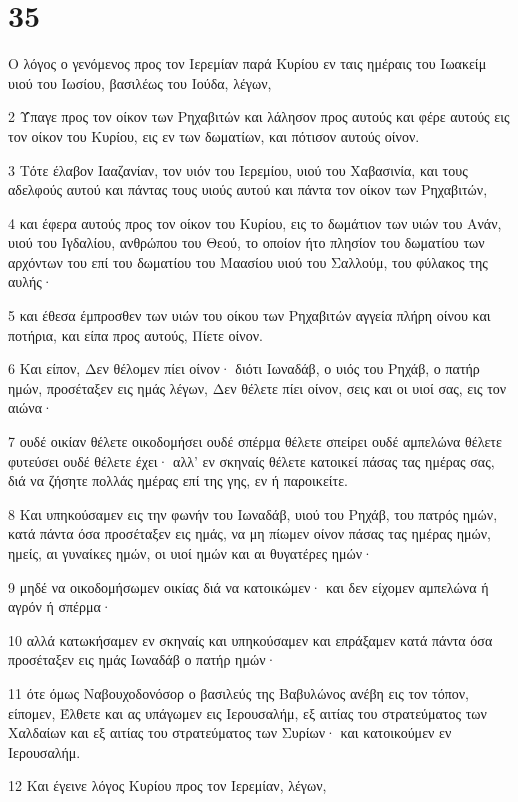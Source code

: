 \chapter{35}

\par Ο λόγος ο γενόμενος προς τον Ιερεμίαν παρά Κυρίου εν ταις ημέραις του Ιωακείμ υιού του Ιωσίου, βασιλέως του Ιούδα, λέγων,
\par 2 Ύπαγε προς τον οίκον των Ρηχαβιτών και λάλησον προς αυτούς και φέρε αυτούς εις τον οίκον του Κυρίου, εις εν των δωματίων, και πότισον αυτούς οίνον.
\par 3 Τότε έλαβον Ιααζανίαν, τον υιόν του Ιερεμίου, υιού του Χαβασινία, και τους αδελφούς αυτού και πάντας τους υιούς αυτού και πάντα τον οίκον των Ρηχαβιτών,
\par 4 και έφερα αυτούς προς τον οίκον του Κυρίου, εις το δωμάτιον των υιών του Ανάν, υιού του Ιγδαλίου, ανθρώπου του Θεού, το οποίον ήτο πλησίον του δωματίου των αρχόντων του επί του δωματίου του Μαασίου υιού του Σαλλούμ, του φύλακος της αυλής·
\par 5 και έθεσα έμπροσθεν των υιών του οίκου των Ρηχαβιτών αγγεία πλήρη οίνου και ποτήρια, και είπα προς αυτούς, Πίετε οίνον.
\par 6 Και είπον, Δεν θέλομεν πίει οίνον· διότι Ιωναδάβ, ο υιός του Ρηχάβ, ο πατήρ ημών, προσέταξεν εις ημάς λέγων, Δεν θέλετε πίει οίνον, σεις και οι υιοί σας, εις τον αιώνα·
\par 7 ουδέ οικίαν θέλετε οικοδομήσει ουδέ σπέρμα θέλετε σπείρει ουδέ αμπελώνα θέλετε φυτεύσει ουδέ θέλετε έχει· αλλ' εν σκηναίς θέλετε κατοικεί πάσας τας ημέρας σας, διά να ζήσητε πολλάς ημέρας επί της γης, εν ή παροικείτε.
\par 8 Και υπηκούσαμεν εις την φωνήν του Ιωναδάβ, υιού του Ρηχάβ, του πατρός ημών, κατά πάντα όσα προσέταξεν εις ημάς, να μη πίωμεν οίνον πάσας τας ημέρας ημών, ημείς, αι γυναίκες ημών, οι υιοί ημών και αι θυγατέρες ημών·
\par 9 μηδέ να οικοδομήσωμεν οικίας διά να κατοικώμεν· και δεν είχομεν αμπελώνα ή αγρόν ή σπέρμα·
\par 10 αλλά κατωκήσαμεν εν σκηναίς και υπηκούσαμεν και επράξαμεν κατά πάντα όσα προσέταξεν εις ημάς Ιωναδάβ ο πατήρ ημών·
\par 11 ότε όμως Ναβουχοδονόσορ ο βασιλεύς της Βαβυλώνος ανέβη εις τον τόπον, είπομεν, Έλθετε και ας υπάγωμεν εις Ιερουσαλήμ, εξ αιτίας του στρατεύματος των Χαλδαίων και εξ αιτίας του στρατεύματος των Συρίων· και κατοικούμεν εν Ιερουσαλήμ.
\par 12 Και έγεινε λόγος Κυρίου προς τον Ιερεμίαν, λέγων,
